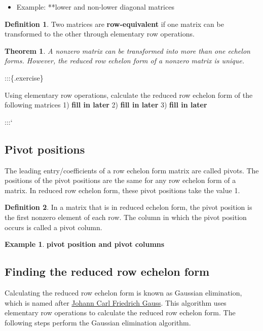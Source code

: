 \documentclass[
]{book}
\providecommand{\tightlist}{%
  \setlength{\itemsep}{0pt}\setlength{\parskip}{0pt}}
\newtheorem{theorem}{Theorem}[chapter]
\theoremstyle{definition}
\newtheorem{definition}{Definition}[chapter]
\theoremstyle{definition}
\newtheorem{example}{Example}[chapter]
\theoremstyle{definition}
\theoremstyle{definition}
\theoremstyle{remark}
\begin{document}
\begin{itemize}
\tightlist
\item
  Example: **lower and non-lower diagonal matrices
\end{itemize}

\begin{definition}
Two matrices are \textbf{row-equivalent} if one matrix can be transformed to the other through elementary row operations.
\end{definition}

\begin{theorem}
A nonzero matrix can be transformed into more than one echelon forms. However, the reduced row echelon form of a nonzero matrix is unique.
\end{theorem}

:::\{.exercise\}

Using elementary row operations, calculate the reduced row echelon form of the following matrices
1) \textbf{fill in later}
2) \textbf{fill in later}
3) \textbf{fill in later}

:::`

\hypertarget{pivot-positions}{%
\subsection{Pivot positions}\label{pivot-positions}}

The leading entry/coefficients of a row echelon form matrix are called pivots. The positions of the pivot positions are the same for any row echelon form of a matrix. In reduced row echelon form, these pivot positions take the value 1.

\begin{definition}
In a matrix that is in reduced echelon form, the pivot position is the first nonzero element of each row. The column in which the pivot position occurs is called a pivot column.
\end{definition}

\begin{example}
\textbf{pivot position and pivot columns}
\end{example}

\hypertarget{finding-the-reduced-row-echelon-form}{%
\subsection{Finding the reduced row echelon form}\label{finding-the-reduced-row-echelon-form}}

Calculating the reduced row echelon form is known as Gaussian elimination, which is named after \href{https://en.wikipedia.org/wiki/Carl_Friedrich_Gauss}{Johann Carl Friedrich Gauss}. This algorithm uses elementary row operations to calculate the reduced row echelon form. The following steps perform the Gaussian elimination algorithm.
\end{document}
